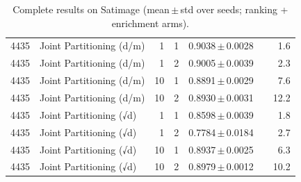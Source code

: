 \begin{table}[ht]
\begin{tabular}{rlrrccr}
4435 & Joint Partitioning (d/m) & 1 & 1 & 0.9038\,$\pm$\,0.0028 &  & 1.6 \\
4435 & Joint Partitioning (d/m) & 1 & 2 & 0.9005\,$\pm$\,0.0039 &  & 2.3 \\
4435 & Joint Partitioning (d/m) & 10 & 1 & 0.8891\,$\pm$\,0.0029 &  & 7.6 \\
4435 & Joint Partitioning (d/m) & 10 & 2 & 0.8930\,$\pm$\,0.0031 &  & 12.2 \\
4435 & Joint Partitioning (√d) & 1 & 1 & 0.8598\,$\pm$\,0.0039 &  & 1.8 \\
4435 & Joint Partitioning (√d) & 1 & 2 & 0.7784\,$\pm$\,0.0184 &  & 2.7 \\
4435 & Joint Partitioning (√d) & 10 & 1 & 0.8937\,$\pm$\,0.0025 &  & 6.3 \\
4435 & Joint Partitioning (√d) & 10 & 2 & 0.8979\,$\pm$\,0.0012 &  & 10.2 \\
\bottomrule
\end{tabular}
\caption{Complete results on Satimage (mean\,$\pm$\,std over seeds; ranking + enrichment arms).}
\label{tab:app_satimage}
\end{table}

